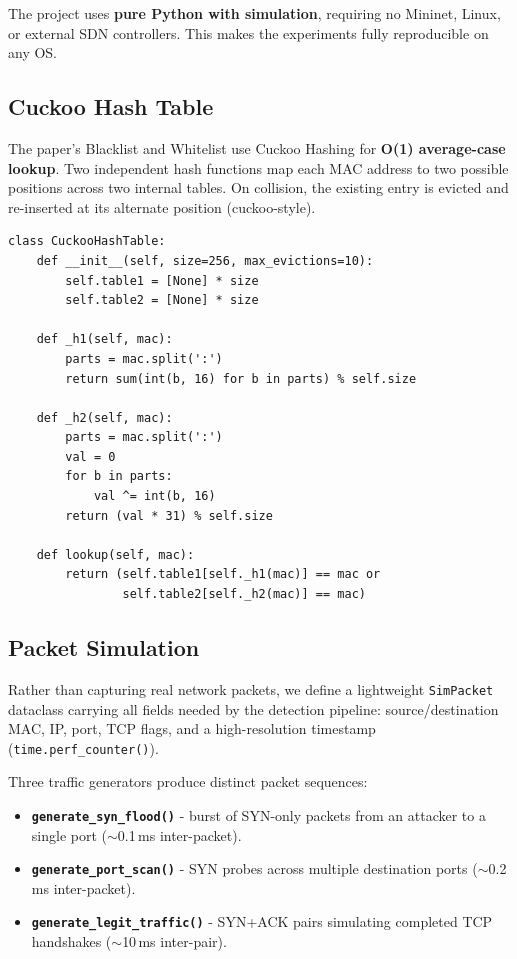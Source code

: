 \documentclass[12pt, a4paper]{article}
\begin{document}
The project uses \textbf{pure Python with simulation}, requiring no Mininet, Linux, or external SDN controllers. This makes the experiments fully reproducible on any OS.

\subsection{Cuckoo Hash Table}

The paper's Blacklist and Whitelist use Cuckoo Hashing for \textbf{O(1) average-case lookup}. Two independent hash functions map each MAC address to two possible positions across two internal tables. On collision, the existing entry is evicted and re-inserted at its alternate position (cuckoo-style).

\begin{lstlisting}[caption={Cuckoo Hash Table - O(1) insert and lookup}]
class CuckooHashTable:
    def __init__(self, size=256, max_evictions=10):
        self.table1 = [None] * size
        self.table2 = [None] * size

    def _h1(self, mac):
        parts = mac.split(':')
        return sum(int(b, 16) for b in parts) % self.size

    def _h2(self, mac):
        parts = mac.split(':')
        val = 0
        for b in parts:
            val ^= int(b, 16)
        return (val * 31) % self.size

    def lookup(self, mac):
        return (self.table1[self._h1(mac)] == mac or
                self.table2[self._h2(mac)] == mac)
\end{lstlisting}

\subsection{Packet Simulation}

Rather than capturing real network packets, we define a lightweight \texttt{SimPacket} dataclass carrying all fields needed by the detection pipeline: source/destination MAC, IP, port, TCP flags, and a high-resolution timestamp (\texttt{time.perf\_counter()}).

Three traffic generators produce distinct packet sequences:
\begin{itemize}[itemsep=3pt]
    \item \textbf{\texttt{generate\_syn\_flood()}} - burst of SYN-only packets from an attacker to a single port ($\sim$0.1\,ms inter-packet).
    \item \textbf{\texttt{generate\_port\_scan()}} - SYN probes across multiple destination ports ($\sim$0.2\,ms inter-packet).
    \item \textbf{\texttt{generate\_legit\_traffic()}} - SYN+ACK pairs simulating completed TCP handshakes ($\sim$10\,ms inter-pair).
\end{itemize}
\end{document}
